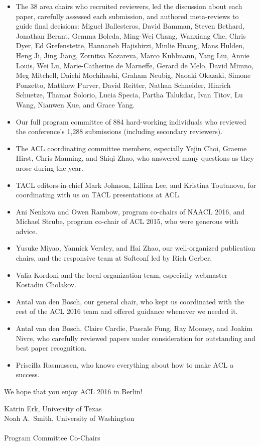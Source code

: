 \begin{itemize}
\item The 38 area chairs who recruited reviewers, led the discussion about each paper, carefully assessed each submission, and authored meta-reviews to guide final decisions:
Miguel Ballesteros,
David Bamman,
Steven Bethard,
Jonathan Berant,
Gemma Boleda,
Ming-Wei Chang,
Wanxiang Che,
Chris Dyer,
Ed Grefenstette,
Hannaneh Hajishirzi,
Minlie Huang,
Mans Hulden,
Heng Ji,
Jing Jiang,
Zornitsa Kozareva,
Marco Kuhlmann,
Yang Liu,
Annie Louis,
Wei Lu,
Marie-Catherine de Marneffe,
Gerard de Melo,
David Mimno,
Meg Mitchell,
Daichi Mochihashi,
Graham Neubig,
Naoaki Okazaki,
Simone Ponzetto,
Matthew Purver,
David Reitter,
Nathan Schneider,
Hinrich Schuetze,
Thamar Solorio,
Lucia Specia,
Partha Talukdar,
Ivan Titov,
Lu Wang,
Nianwen Xue, and
Grace Yang.
\item Our full program committee of 884 hard-working individuals who reviewed the conference's 1,288 submissions (including secondary reviewers). 
\item The ACL coordinating committee members, especially Yejin Choi,  Graeme Hirst,  Chris Manning, and Shiqi Zhao, who answered many questions as they arose during the year.
\item TACL editors-in-chief Mark Johnson, Lillian Lee, and Kristina Toutanova, for coordinating with us on TACL presentations at ACL.
\item Ani Nenkova and Owen Rambow, program co-chairs of NAACL 2016, and Michael Strube, program co-chair of ACL 2015, who were generous with advice.
\item Yusuke Miyao, Yannick Versley, and Hai Zhao, our well-organized publication chairs, and the responsive team at Softconf led by Rich Gerber.
\item Valia Kordoni and the local organization team, especially webmaster Kostadin Cholakov.
\item Antal van den Bosch, our general chair, who kept us coordinated with the rest of the ACL 2016 team and offered guidance whenever we needed it.
\item Antal van den Bosch, Claire Cardie, Pascale Fung, Ray Mooney, and Joakim Nivre, who carefully reviewed papers under consideration for outstanding and best paper recognition.
\item Priscilla Rasmussen, who knows everything about how to make ACL a success.
\end{itemize}

We hope that you enjoy ACL 2016 in Berlin!

\vskip 0.2in
\noindent Katrin Erk, University of Texas \\
\noindent Noah A.~Smith, University of Washington \\ \\
Program Committee Co-Chairs

